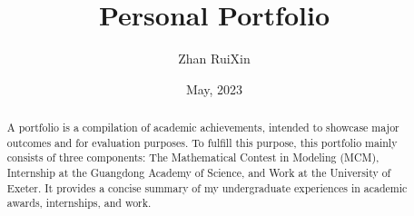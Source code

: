 \documentclass[12pt]{article}
\title{Personal Portfolio}
\author{Zhan RuiXin}
\date{May, 2023}
\begin{document}
\maketitle

\renewcommand{\abstractname}{\large Abstract}
\begin{abstract}
\noindent
\large A portfolio is a compilation of academic achievements, intended to showcase major outcomes and for evaluation purposes. To fulfill this purpose, this portfolio mainly consists of three components: The Mathematical Contest in Modeling (MCM), Internship at the Guangdong Academy of Science, and Work at the University of Exeter. It provides a concise summary of my undergraduate experiences in academic awards, internships, and work.
\end{abstract}

{} %

% 
%
%
%
%



%
%
%
\end{document}

